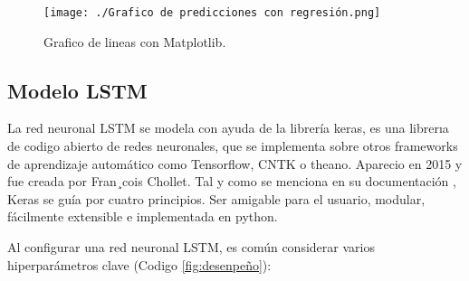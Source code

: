 
\begin{figure}[H]
  \begin{center}
    \texttt{[image: ./Grafico de predicciones con regresión.png]}
    \caption{Grafico de lineas con Matplotlib.}
    \label{fig:prediccion_regresion_cap3}
  \end{center}
\end{figure}

\subsection{Modelo LSTM}

La red neuronal LSTM se modela con ayuda de la librería keras, es una librerıa
de codigo abierto de redes neuronales, que se implementa sobre otros frameworks
de aprendizaje automático como Tensorflow, CNTK o theano. Aparecio en 2015 y
fue creada por Fran¸cois Chollet. Tal y como se menciona en su documentación
\cite{keras-doc}, Keras se guía por cuatro principios. Ser amigable para el
usuario, modular, fácilmente extensible e implementada en python.

\vspace{1\baselineskip}
Al configurar una red neuronal LSTM, es común considerar varios hiperparámetros
clave (Codigo \ref{fig:desenpeño}):


